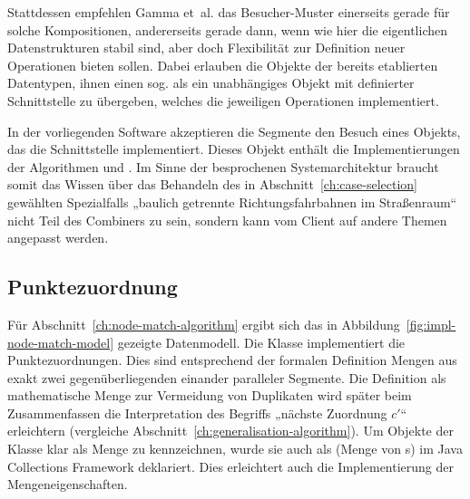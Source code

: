 \documentclass[../main/thesis.tex]{subfiles}
\begin{document}
Stattdessen empfehlen Gamma et~al. das Besucher-Muster  einerseits gerade für solche Kompositionen, andererseits gerade dann, wenn wie hier die eigentlichen Datenstrukturen stabil sind, aber doch Flexibilität zur Definition neuer Operationen bieten sollen. 
Dabei erlauben die Objekte der bereits etablierten Datentypen, ihnen einen sog.  als ein unabhängiges Objekt mit definierter Schnittstelle zu übergeben, welches die jeweiligen Operationen implementiert. 

In der vorliegenden Software akzeptieren die Segmente den Besuch eines Objekts, das die Schnittstelle  implementiert.
Dieses Objekt enthält die Implementierungen der Algorithmen  und .
Im Sinne der besprochenen Systemarchitektur braucht somit das Wissen über das Behandeln des in Abschnitt~\ref{ch:case-selection} gewählten Spezialfalls „baulich getrennte Richtungsfahrbahnen im Straßenraum“ nicht Teil des Combiners zu sein, sondern kann vom Client auf andere Themen angepasst werden.



\subsection{Punktezuordnung}

Für Abschnitt~\ref{ch:node-match-algorithm} ergibt sich das in Abbildung~\ref{fig:impl-node-match-model} gezeigte Datenmodell.
Die Klasse  implementiert die Punktezuordnungen.
Dies sind entsprechend der formalen Definition Mengen aus exakt zwei gegenüberliegenden  einander paralleler Segmente.
Die Definition als mathematische Menge zur Vermeidung von Duplikaten wird später beim Zusammenfassen die Interpretation des Begriffs „nächste Zuordnung $c'$“ erleichtern (vergleiche Abschnitt~\ref{ch:generalisation-algorithm}).
Um Objekte der Klasse  klar als Menge zu kennzeichnen, wurde sie auch als  (Menge von s) im Java Collections Framework deklariert.
Dies erleichtert auch die Implementierung der Mengeneigenschaften.

\end{document}
